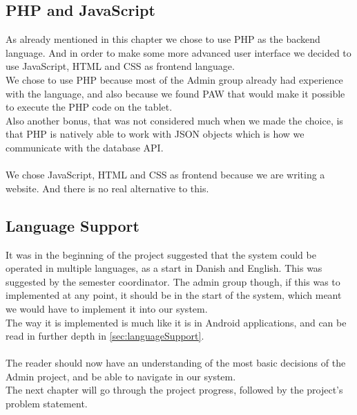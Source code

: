 \subsection{PHP and JavaScript}
As already mentioned in this chapter we chose to use PHP as the backend language. And in order to make some more advanced user interface we decided to use JavaScript, HTML and CSS as frontend language.\\
We chose to use PHP because most of the Admin group already had experience with the language, and also because we found PAW that would make it possible to execute the PHP code on the tablet.\\
Also another bonus, that was not considered much when we made the choice, is that PHP is natively able to work with JSON objects which is how we communicate with the database API.\\
\\
We chose JavaScript, HTML and CSS as frontend because we are writing a website. And there is no real alternative to this.

\subsection{Language Support}
It was in the beginning of the project suggested that the system could be operated in multiple languages, as a start in Danish and English. This was suggested by the semester coordinator. The admin group though, if this was to implemented at any point, it should be in the start of the system, which meant we would have to implement it into our system.\\
The way it is implemented is much like it is in Android applications, and can be read in further depth in \vref{sec:languageSupport}.\\
\\
The reader should now have an understanding of the most basic decisions of the Admin project, and be able to navigate in our system.\\
The next chapter will go through the project progress, followed by the project's problem statement.

